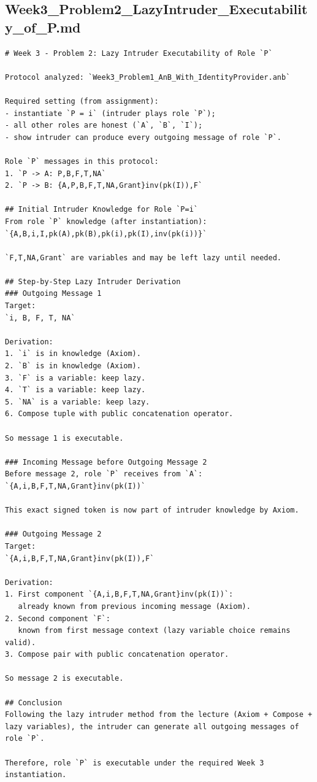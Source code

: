 \documentclass[11pt,a4paper]{article}
\begin{document}
\subsection{Week3\_Problem2\_LazyIntruder\_Executability\_of\_P.md}
\begin{lstlisting}
# Week 3 - Problem 2: Lazy Intruder Executability of Role `P`

Protocol analyzed: `Week3_Problem1_AnB_With_IdentityProvider.anb`

Required setting (from assignment):
- instantiate `P = i` (intruder plays role `P`);
- all other roles are honest (`A`, `B`, `I`);
- show intruder can produce every outgoing message of role `P`.

Role `P` messages in this protocol:
1. `P -> A: P,B,F,T,NA`
2. `P -> B: {A,P,B,F,T,NA,Grant}inv(pk(I)),F`

## Initial Intruder Knowledge for Role `P=i`
From role `P` knowledge (after instantiation):
`{A,B,i,I,pk(A),pk(B),pk(i),pk(I),inv(pk(i))}`

`F,T,NA,Grant` are variables and may be left lazy until needed.

## Step-by-Step Lazy Intruder Derivation
### Outgoing Message 1
Target:
`i, B, F, T, NA`

Derivation:
1. `i` is in knowledge (Axiom).
2. `B` is in knowledge (Axiom).
3. `F` is a variable: keep lazy.
4. `T` is a variable: keep lazy.
5. `NA` is a variable: keep lazy.
6. Compose tuple with public concatenation operator.

So message 1 is executable.

### Incoming Message before Outgoing Message 2
Before message 2, role `P` receives from `A`:
`{A,i,B,F,T,NA,Grant}inv(pk(I))`

This exact signed token is now part of intruder knowledge by Axiom.

### Outgoing Message 2
Target:
`{A,i,B,F,T,NA,Grant}inv(pk(I)),F`

Derivation:
1. First component `{A,i,B,F,T,NA,Grant}inv(pk(I))`:
   already known from previous incoming message (Axiom).
2. Second component `F`:
   known from first message context (lazy variable choice remains valid).
3. Compose pair with public concatenation operator.

So message 2 is executable.

## Conclusion
Following the lazy intruder method from the lecture (Axiom + Compose + lazy variables), the intruder can generate all outgoing messages of role `P`.

Therefore, role `P` is executable under the required Week 3 instantiation.
\end{lstlisting}
\end{document}
